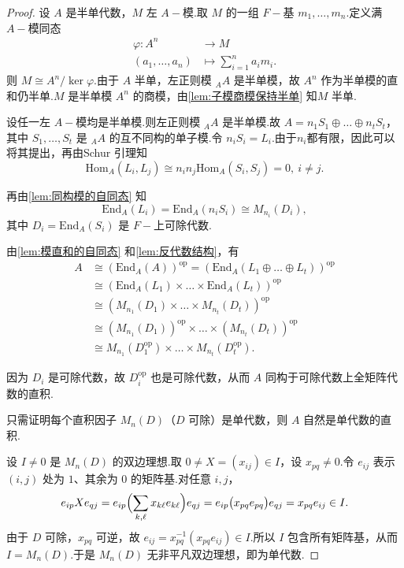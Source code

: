 \begin{proof}
 设 $A$ 是半单代数，$M$ 左 $A-\!\!$模.取 $M$ 的一组 $F-\!\!$基 $m_1, \dots, m_n$.定义满 $A-\!\!$模同态
\begin{align*}
    \varphi: A^n &\to M \\[-5pt]
    (a_1, \dots, a_n) &\mapsto \sum_{i=1}^n a_i m_i.
\end{align*}
则 $M \cong A^n / \ker\varphi$.由于 $A$ 半单，左正则模 ${}_A A$ 是半单模，故 $A^n$ 作为半单模的直和仍半单.$M$ 是半单模 $A^n$ 的商模，由\cref{lem:子模商模保持半单} 知$M$ 半单.

 设任一左 $A-\!\!$模均是半单模.则左正则模 ${}_A A$ 是半单模.故 $A = n_1S_1 \oplus \dots \oplus n_tS_t$，其中 $S_1, \dots, S_t$ 是 ${}_A A$ 的互不同构的单子模.令 $n_iS_i = L_i$.由于$n_i$都有限，因此可以将其提出，再由Schur 引理知
$$
\mathrm{Hom}_A(L_i, L_j) \cong n_i n_j \mathrm{Hom}_A(S_i, S_j) = 0, \ i \neq j.
$$

再由\cref{lem:同构模的自同态} 知
$$
\mathrm{End}_A(L_i) = \mathrm{End}_A(n_iS_i) \cong M_{n_i}(D_i),
$$
其中 $D_i = \mathrm{End}_A(S_i)$ 是 $F-\!\!$上可除代数.

由\cref{lem:模直和的自同态} 和\cref{lem:反代数结构}，有
$$
\begin{aligned}
A &\cong (\mathrm{End}_A(A))^{\mathrm{op}} = (\mathrm{End}_A(L_1 \oplus \dots \oplus L_t))^{\mathrm{op}} \\
&\cong (\mathrm{End}_A(L_1) \times \dots \times \mathrm{End}_A(L_t))^{\mathrm{op}} \\
&\cong (M_{n_1}(D_1) \times \dots \times M_{n_t}(D_t))^{\mathrm{op}} \\
&\cong (M_{n_1}(D_1))^{\mathrm{op}} \times \dots \times (M_{n_t}(D_t))^{\mathrm{op}} \\
&\cong M_{n_1}(D_1^{\mathrm{op}}) \times \dots \times M_{n_t}(D_t^{\mathrm{op}}).
\end{aligned}
$$

因为 $D_i$ 是可除代数，故 $D_i^{\mathrm{op}}$ 也是可除代数，从而 $A$ 同构于可除代数上全矩阵代数的直积.

 只需证明每个直积因子 $M_{n}(D)$（$D$ 可除）是单代数，则 $A$ 自然是单代数的直积.

设 $I \neq 0$ 是 $M_n(D)$ 的双边理想.取 $0 \neq X = (x_{ij}) \in I$，设 $x_{pq} \neq 0$.令 $e_{ij}$ 表示 $(i,j)$ 处为 $1$、其余为 $0$ 的矩阵基.对任意 $i,j$，
\[
e_{ip} X e_{qj} = e_{ip}\Bigl(\sum_{k,\ell} x_{k\ell} e_{k\ell}\Bigr) e_{qj}
= e_{ip} \bigl(x_{pq} e_{pq}\bigr) e_{qj}
= x_{pq} e_{ij} \in I.
\]
由于 $D$ 可除，$x_{pq}$ 可逆，故 $e_{ij} = x_{pq}^{-1} (x_{pq} e_{ij}) \in I$.所以 $I$ 包含所有矩阵基，从而 $I = M_n(D)$.于是 $M_n(D)$ 无非平凡双边理想，即为单代数.


\end{proof}
